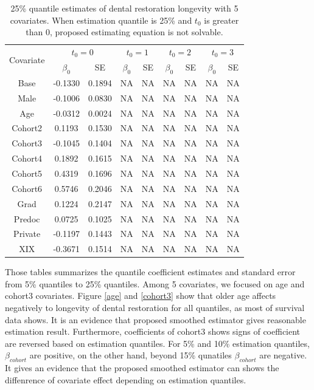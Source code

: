 \documentclass[titlepage,english,12pt]{article}
\begin{document}
	\begin{table}[H] \label{table:13}
		\caption{25\% quantile estimates of dental restoration longevity with 5 covariates. When estimation quantile is 25\% and $t_0$ is greater than 0, proposed estimating equation is not solvable.}
		\centering
		\begin{tabular}{|c|c|c|c|c|c|c|c|c|}
			\hline
			\multirow{2}{*}{Covariate} & \multicolumn{2}{c|}{$t_0=0$} & \multicolumn{2}{c|}{$t_0=1$} & \multicolumn{2}{c|}{$t_0=2$} & \multicolumn{2}{c|}{$t_0=3$}\\ 
			\cline{2-9}
			& $\beta_0$ & SE & $\beta_0$ & SE & $\beta_0$ & SE & $\beta_0$ & SE\\
			\hline\hline
			Base & -0.1330 & 0.1894 & NA & NA & NA & NA & NA & NA \\ 
			Male & -0.1006 & 0.0830 & NA & NA & NA & NA & NA & NA \\ 
			Age & -0.0312 & 0.0024 & NA & NA & NA & NA & NA & NA \\ 
			Cohort2 & 0.1193 & 0.1530 & NA & NA & NA & NA & NA & NA \\  
			Cohort3 & -0.1045 & 0.1404 & NA & NA & NA & NA & NA & NA \\  
			Cohort4 & 0.1892 & 0.1615 & NA & NA & NA & NA & NA & NA \\  
			Cohort5 & 0.4319 & 0.1696 & NA & NA & NA & NA & NA & NA \\ 
			Cohort6 & 0.5746 & 0.2046 & NA & NA & NA & NA & NA & NA \\ 
			Grad & 0.1224 & 0.2147 & NA & NA & NA & NA & NA & NA \\ 
			Predoc & 0.0725 & 0.1025 & NA & NA & NA & NA & NA & NA \\ 
			Private & -0.1197 & 0.1443 & NA & NA & NA & NA & NA & NA \\ 
			XIX & -0.3671 & 0.1514 & NA & NA & NA & NA & NA & NA \\ 
			\hline
		\end{tabular}
	\end{table}

	\noindent Those tables summarizes the quantile coefficient estimates and standard error from 5\% quantiles to 25\% quantiles. Among 5 covariates, we focused on age and cohort3 covariates. Figure \ref{age} and \ref{cohort3} show that older age affects negatively to longevity of dental restoration for all quantiles, as most of survival data shows. It is an evidence that proposed smoothed estimator gives reasonable estimation result. Furthermore, coefficients of cohort3 shows signs of coefficient are reversed based on estimation quantiles. For 5\% and 10\% estimation quantiles, $\beta_{cohort}$ are positive, on the other hand, beyond 15\% qunatiles $\beta_{cohort}$ are negative. It gives an evidence that the proposed smoothed estimator can shows the diffenrence of covariate effect depending on estimation quantiles.
\end{document}
